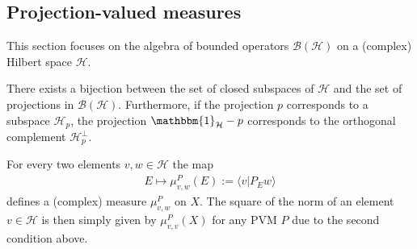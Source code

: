 \subsection{Projection-valued measures}\label{section:PVM}

    This section focuses on the algebra of bounded operators $\mathcal{B}(\mathcal{H})$ on a (complex) Hilbert space $\mathcal{H}$.

    \begin{property}
        There exists a bijection between the set of closed subspaces of $\mathcal{H}$ and the set of projections in $\mathcal{B}(\mathcal{H})$. Furthermore, if the projection $p$ corresponds to a subspace $\mathcal{H}_p$, the projection $\mathbbm{1}_\mathcal{H}-p$ corresponds to the orthogonal complement $\mathcal{H}^\perp_p$.
    \end{property}

    \begin{property}
        For every two elements $v,w\in\mathcal{H}$ the map
        \begin{gather}
            E\mapsto\mu^P_{v,w}(E):=\langle v|P_Ew \rangle
        \end{gather}
        defines a (complex) measure $\mu^P_{v,w}$ on $X$. The square of the norm of an element $v\in\mathcal{H}$ is then simply given by $\mu^P_{v,v}(X)$ for any PVM $P$ due to the second condition above.
    \end{property}

